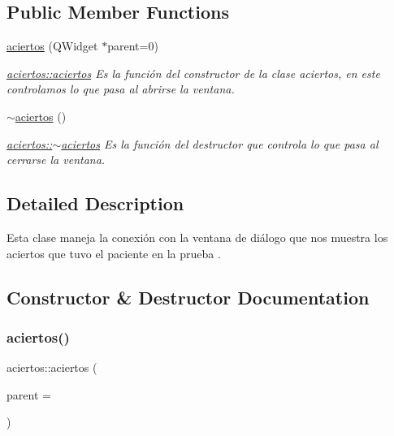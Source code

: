 \subsection*{Public Member Functions}
\begin{DoxyCompactItemize}
\item 
\hyperlink{classaciertos_a46e28661870e72ccb00b558478420f64}{aciertos} (Q\+Widget $\ast$parent=0)
\begin{DoxyCompactList}\small\item\em \hyperlink{classaciertos_a46e28661870e72ccb00b558478420f64}{aciertos\+::aciertos} Es la función del constructor de la clase aciertos, en este controlamos lo que pasa al abrirse la ventana. \end{DoxyCompactList}\item 
\hyperlink{classaciertos_aef1c2b79f77ef192dd48a2359c78b83d}{$\sim$aciertos} ()
\begin{DoxyCompactList}\small\item\em \hyperlink{classaciertos_aef1c2b79f77ef192dd48a2359c78b83d}{aciertos\+::$\sim$aciertos} Es la función del destructor que controla lo que pasa al cerrarse la ventana. \end{DoxyCompactList}\end{DoxyCompactItemize}


\subsection{Detailed Description}
Esta clase maneja la conexión con la ventana de diálogo que nos muestra los aciertos que tuvo el paciente en la prueba . 

\subsection{Constructor \& Destructor Documentation}
\mbox{\label{classaciertos_a46e28661870e72ccb00b558478420f64}} 
\subsubsection{\texorpdfstring{aciertos()}{aciertos()}}
{\footnotesize\ttfamily aciertos\+::aciertos (\begin{DoxyParamCaption}\item[{Q\+Widget $\ast$}]{parent = {} }\end{DoxyParamCaption})\hspace{0.3cm}{\ttfamily [explicit]}}



